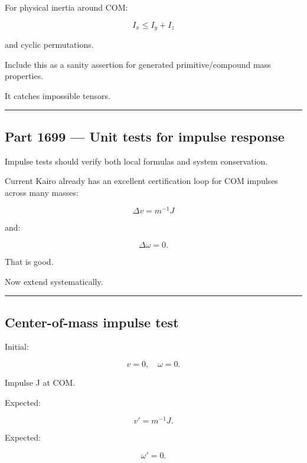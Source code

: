 \hypertarget{06-engine-ii-ch039-principal-moment-triangle-inequalities}{}

For physical inertia around COM:

\[
I_x\le I_y+I_z
\]

and cyclic permutations.

Include this as a sanity assertion for generated primitive/compound mass properties.

It catches impossible tensors.

\begin{center}\rule{0.5\linewidth}{0.5pt}\end{center}

\subsection{Part 1699 --- Unit tests for impulse response}\label{06-engine-ii-ch039-part-1699-unit-tests-for-impulse-response}

\hypertarget{06-engine-ii-ch039-part-1699-unit-tests-for-impulse-response}{}

Impulse tests should verify both local formulas and system conservation.

Current Kairo already has an excellent certification loop for COM impulses across many masses:

\[
\Delta v
=
m^{-1}J
\]

and:

\[
\Delta\omega=0.
\]

That is good.

Now extend systematically.

\begin{center}\rule{0.5\linewidth}{0.5pt}\end{center}

\subsection{Center-of-mass impulse test}\label{06-engine-ii-ch039-center-of-mass-impulse-test}

\hypertarget{06-engine-ii-ch039-center-of-mass-impulse-test}{}

Initial:

\[
v=0,
\quad
\omega=0.
\]

Impulse J at COM.

Expected:

\[
v'=m^{-1}J.
\]

Expected:

\[
\omega'=0.
\]

